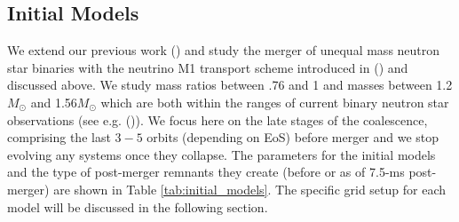 






\subsection{Initial Models}
\label{sec:initial_models}
We extend our previous work (\cite{foucart:2015gaa}) and study the merger
of unequal mass neutron star binaries with the neutrino M1 transport scheme introduced in (\cite{foucart2016impact}) and discussed above. We study mass ratios between .76 and 1 and masses between 1.2$M_\odot$ and 1.56$M_\odot$ which are both within the ranges of current binary neutron star observations (see e.g. (\cite{lattimer:2012nd})). We focus here on the late stages of the coalescence, comprising the last $3-5$ orbits (depending on EoS) before merger and we stop evolving any systems once they collapse. The parameters for the initial models and the type of post-merger remnants they create (before or as of 7.5-ms post-merger) are shown in Table \ref{tab:initial_models}. The specific grid setup for each model will be discussed in the following section.

